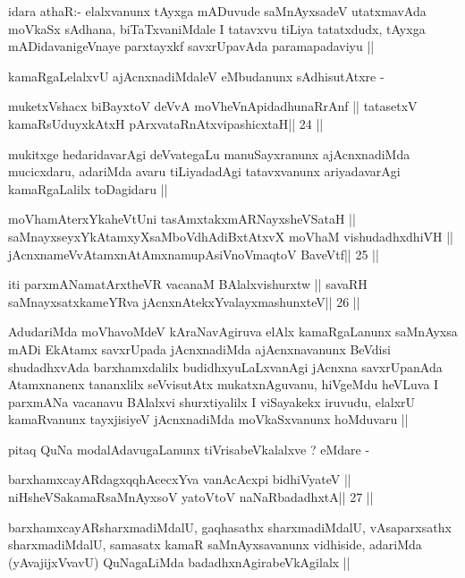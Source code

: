 \begin{artha}
idara athaR:- elalxvanunx tAyxga mADuvude saMnAyxsadeV utatxmavAda
moVkaSx sAdhana, biTaTxvaniMdale I tatavxvu tiLiya tatatxdudx, tAyxga
mADidavanigeVnaye parxtayxkf savxrUpavAda paramapadaviyu ||

kamaRgaLelalxvU ajAcnxnadiMdaleV eMbudanunx sAdhisutAtxre -
\end{artha}

\begin{shl}
muketxVshacx biBayxtoV deVvA moVheVnApidadhunaRrAnf ||
tatasetxV kamaRsUduyxkAtxH pArxvataRnAtxvipashicxtaH\hfill || 24 ||
\end{shl}

\begin{artha}
mukitxge hedaridavarAgi deVvategaLu manuSayxranunx ajAcnxnadiMda
mucicxdaru, adariMda avaru tiLiyadadAgi tatavxvanunx ariyadavarAgi
kamaRgaLalilx toDagidaru ||
\end{artha}

\begin{shl}
moVhamAterxYkaheVtUni tasAmxtakxmARNayxsheVSataH ||
saMnayxseyxYkAtamxyXsaMboVdhAdiBxtAtxvX moVhaM vishudadhxdhiVH ||
jAcnxnameVvA\s\s tamxnA\s\s tAmxnamupAsiVnoV\s maqtoV BaveVtf\hfill || 25 ||
\end{shl}

\begin{shl}
iti parxmANamatArxtheVR vacanaM BAlalxvishurxtw ||
savaRH saMnayxsatxkameYRva jAcnxnAtekxYvalayxmashunxteV\hfill || 26 ||
\end{shl}

\begin{artha}
AdudariMda moVhavoMdeV kAraNavAgiruva elAlx kamaRgaLanunx saMnAyxsa
mADi EkAtamx savxrUpada jAcnxnadiMda ajAcnxnavanunx BeVdisi
shudadhxvAda barxhamxdalilx budidhxyuLaLxvanAgi jAcnxna savxrUpanAda
Atamxnanenx tananxlilx seVvisutAtx mukatxnAguvanu, hiVgeMdu heVLuva I
parxmANa vacanavu BAlalxvi shurxtiyalilx I viSayakekx iruvudu, elalxrU
kamaRvanunx tayxjisiyeV jAcnxnadiMda moVkaSxvanunx hoMduvaru ||

pitaq QuNa modalAdavugaLanunx tiVrisabeVkalalxve ? eMdare -
\end{artha}

\begin{shl}
barxhamxcayARdagxqqhAcecxYva vanAcAcxpi bidhiVyateV ||
niHsheVSakamaRsaMnAyxsoV yatoV\s toV naNaRbadadhxtA\hfill || 27 ||
\end{shl}

\begin{artha}
barxhamxcayARsharxmadiMdalU, gaqhasathx sharxmadiMdalU, vAsaparxsathx
sharxmadiMdalU, samasatx kamaR saMnAyxsavanunx vidhiside, adariMda
(yAvajijxVvavU) QuNagaLiMda badadhxnAgirabeVkAgilalx ||
\end{artha}

